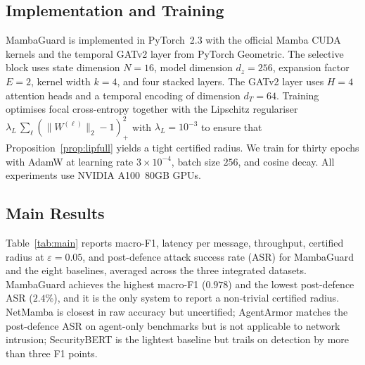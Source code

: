 \documentclass[journal,10pt,twocolumn]{IEEEtran}
\begin{document}
\subsection{Implementation and Training}
MambaGuard is implemented in PyTorch~2.3 with the official Mamba CUDA kernels and the temporal GATv2 layer from PyTorch Geometric. The selective block uses state dimension $N=16$, model dimension $d_{z}=256$, expansion factor $E=2$, kernel width $k=4$, and four stacked layers. The GATv2 layer uses $H=4$ attention heads and a temporal encoding of dimension $d_{T}=64$. Training optimises focal cross-entropy together with the Lipschitz regulariser $\lambda_{L}\,\sum_{\ell}(\|W^{(\ell)}\|_{2}-1)_{+}^{2}$ with $\lambda_{L}=10^{-3}$ to ensure that Proposition~\ref{prop:lipfull} yields a tight certified radius. We train for thirty epochs with AdamW at learning rate $3\times10^{-4}$, batch size $256$, and cosine decay. All experiments use NVIDIA A100~80GB GPUs.

\subsection{Main Results}
\label{sec:results}
Table~\ref{tab:main} reports macro-F1, latency per message, throughput, certified radius at $\varepsilon=0.05$, and post-defence attack success rate (ASR) for MambaGuard and the eight baselines, averaged across the three integrated datasets. MambaGuard achieves the highest macro-F1 ($0.978$) and the lowest post-defence ASR ($2.4\%$), and it is the only system to report a non-trivial certified radius. NetMamba is closest in raw accuracy but uncertified; AgentArmor matches the post-defence ASR on agent-only benchmarks but is not applicable to network intrusion; SecurityBERT is the lightest baseline but trails on detection by more than three F1 points.
\end{document}
